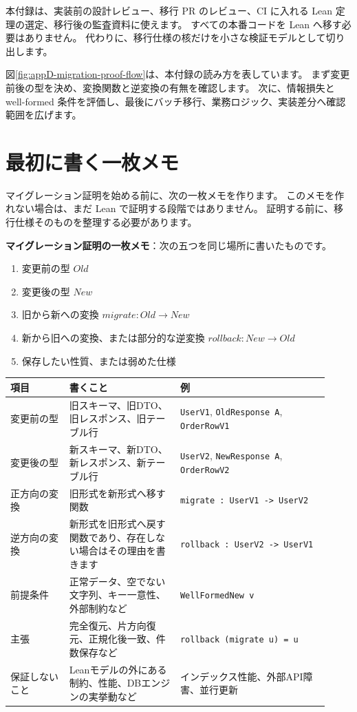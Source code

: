 本付録は、実装前の設計レビュー、移行 PR のレビュー、CI に入れる Lean 定理の選定、移行後の監査資料に使えます。
すべての本番コードを Lean へ移す必要はありません。
代わりに、移行仕様の核だけを小さな検証モデルとして切り出します。


図\ref{fig:appD-migration-proof-flow}は、本付録の読み方を表しています。
まず変更前後の型を決め、変換関数と逆変換の有無を確認します。
次に、情報損失と well-formed 条件を評価し、最後にバッチ移行、業務ロジック、実装差分へ確認範囲を広げます。

\section{最初に書く一枚メモ}

マイグレーション証明を始める前に、次の一枚メモを作ります。
このメモを作れない場合は、まだ Lean で証明する段階ではありません。
証明する前に、移行仕様そのものを整理する必要があります。

\textbf{マイグレーション証明の一枚メモ}：次の五つを同じ場所に書いたものです。

\begin{enumerate}
\item 変更前の型 \(Old\)
\item 変更後の型 \(New\)
\item 旧から新への変換 \(migrate : Old \to New\)
\item 新から旧への変換、または部分的な逆変換 \(rollback : New \to Old\)
\item 保存したい性質、または弱めた仕様
\end{enumerate}

\begin{longtable}{@{}p{0.17\linewidth}p{0.32\linewidth}p{0.43\linewidth}@{}}
\toprule
項目 & 書くこと & 例 \\
\midrule
\endhead
変更前の型 & 旧スキーマ、旧DTO、旧レスポンス、旧テーブル行 & \texttt{UserV1}, \texttt{OldResponse A}, \texttt{OrderRowV1} \\
変更後の型 & 新スキーマ、新DTO、新レスポンス、新テーブル行 & \texttt{UserV2}, \texttt{NewResponse A}, \texttt{OrderRowV2} \\
正方向の変換 & 旧形式を新形式へ移す関数 & \texttt{migrate : UserV1 -> UserV2} \\
逆方向の変換 & 新形式を旧形式へ戻す関数であり、存在しない場合はその理由を書きます & \texttt{rollback : UserV2 -> UserV1} \\
前提条件 & 正常データ、空でない文字列、キー一意性、外部制約など & \texttt{WellFormedNew v} \\
主張 & 完全復元、片方向復元、正規化後一致、件数保存など & \texttt{rollback (migrate u) = u} \\
保証しないこと & Leanモデルの外にある制約、性能、DBエンジンの実挙動など & インデックス性能、外部API障害、並行更新 \\
\bottomrule
\end{longtable}

